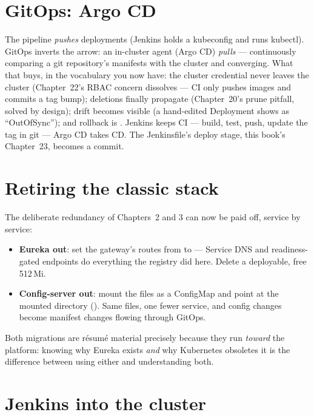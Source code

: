 \section{GitOps: Argo CD}

The pipeline \emph{pushes} deployments (Jenkins holds a kubeconfig and
runs kubectl). GitOps inverts the arrow: an in-cluster agent
(Argo CD) \emph{pulls} --- continuously comparing a git repository's
manifests with the cluster and converging. What that buys, in the
vocabulary you now have: the cluster credential never leaves the
cluster (Chapter~22's RBAC concern dissolves --- CI only pushes images
and commits a tag bump); deletions finally propagate (Chapter~20's
prune pitfall, solved by design); drift becomes visible (a hand-edited
Deployment shows as ``OutOfSync''); and rollback is .
Jenkins keeps CI --- build, test, push, update the tag in git ---
Argo CD takes CD. The Jenkinsfile's deploy stage, this book's
Chapter~23, becomes a commit.

\section{Retiring the classic stack}

The deliberate redundancy of Chapters~2 and 3 can now be paid off,
service by service:

\begin{itemize}
  \item \textbf{Eureka out}: set the gateway's routes from
   to  ---
  Service DNS and readiness-gated endpoints do everything the registry
  did here. Delete a deployable, free 512\,Mi.
  \item \textbf{Config-server out}: mount the 
  files as a ConfigMap and point
   at the mounted directory
  (). Same files, one fewer service, and
  config changes become manifest changes flowing through GitOps.
\end{itemize}

Both migrations are résumé material precisely because they run
\emph{toward} the platform: knowing why Eureka exists \emph{and} why
Kubernetes obsoletes it is the difference between using either and
understanding both.

\section{Jenkins into the cluster}

